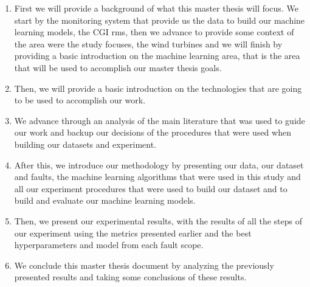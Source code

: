 \begin{enumerate}
    \item
First we will provide a background of what this master thesis will focus. We start by the monitoring system that provide us the data to build our machine learning models, the CGI \acrshort{rms}, then we advance to provide some context of the area were the study focuses, the wind turbines and we will finish by providing a basic introduction on the machine learning area, that is the area that will be used to accomplish our master thesis goals.

\item
Then, we will provide a basic introduction on the technologies that are going to be used to accomplish our work.

\item
We advance through an analysis of the main literature that was used to guide our work and backup our decisions of the procedures that were used when building our datasets and experiment.

\item
After this, we introduce our methodology by presenting our data, our dataset and faults, the machine learning algorithms that were used in this study and all our experiment procedures that were used to build our dataset and to build and evaluate our machine learning models.

\item
Then, we present our experimental results, with the results of all the steps of our experiment using the metrics presented earlier and the best hyperparameters and model from each fault scope.

\item
We conclude this master thesis document by analyzing the previously presented results and taking some conclusions of these results.

\end{enumerate}
